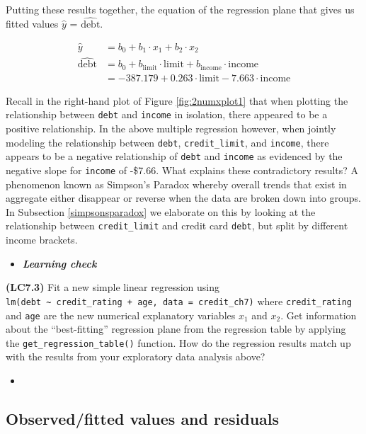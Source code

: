 \documentclass[12pt, krantz2,]{krantz}
\newenvironment{rmdblock}[1]
  {\begin{shaded*}
  \begin{itemize}
  \renewcommand{\labelitemi}{
    \raisebox{-.7\height}[0pt][0pt]{
    }
  }
  \item
  }
  {
  \end{itemize}
  \end{shaded*}
  }
\newenvironment{learncheck}
  {\begin{rmdblock}{warning}}
  {\end{rmdblock}}
\begin{document}
Putting these results together, the equation of the regression plane that gives us fitted values \(\widehat{y}\) = \(\widehat{\text{debt}}\).

\[
\begin{aligned}
\widehat{y} &= b_0 + b_1 \cdot x_1 +  b_2 \cdot x_2\\
\widehat{\text{debt}} &= b_0 + b_{\text{limit}} \cdot \text{limit} + b_{\text{income}} \cdot \text{income}\\
&= -387.179 + 0.263 \cdot\text{limit} - 7.663 \cdot\text{income}
\end{aligned}
\]

Recall in the right-hand plot of Figure \ref{fig:2numxplot1} that when plotting the relationship between \texttt{debt} and \texttt{income} in isolation, there appeared to be a positive relationship. In the above multiple regression however, when jointly modeling the relationship between \texttt{debt}, \texttt{credit\_limit}, and \texttt{income}, there appears to be a negative relationship of \texttt{debt} and \texttt{income} as evidenced by the negative slope for \texttt{income} of -\$7.66. What explains these contradictory results? A phenomenon known as Simpson's Paradox whereby overall trends that exist in aggregate either disappear or reverse when the data are broken down into groups. In Subsection \ref{simpsonsparadox} we elaborate on this by looking at the relationship between \texttt{credit\_limit} and credit card \texttt{debt}, but split by different income brackets.

\begin{learncheck}
\textbf{\emph{Learning check}}
\end{learncheck}

\textbf{(LC7.3)} Fit a new simple linear regression using \texttt{lm(debt\ \textasciitilde{}\ credit\_rating\ +\ age,\ data\ =\ credit\_ch7)} where \texttt{credit\_rating} and \texttt{age} are the new numerical explanatory variables \(x_1\) and \(x_2\). Get information about the ``best-fitting'' regression plane from the regression table by applying the \texttt{get\_regression\_table()} function. How do the regression results match up with the results from your exploratory data analysis above?

\begin{learncheck}

\end{learncheck}

\hypertarget{model3points}{%
\subsection{Observed/fitted values and residuals}\label{model3points}}
\end{document}
